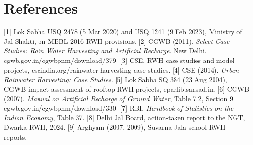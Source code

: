 \section*{References}
\scriptsize\setlength{\parskip}{0pt}
[1] Lok Sabha USQ 2478 (5 Mar 2020) and USQ 1241 (9 Feb 2023), Ministry of Jal Shakti, on MBBL 2016 RWH provisions.
[2] CGWB (2011). \emph{Select Case Studies: Rain Water Harvesting and Artificial Recharge}. New Delhi. cgwb.gov.in/cgwbpnm/download/379.
[3] CSE, RWH case studies and model projects, cseindia.org/rainwater-harvesting-case-studies. [4] CSE (2014). \emph{Urban Rainwater Harvesting: Case Studies}.
[5] Lok Sabha SQ 384 (23 Aug 2004), CGWB impact assessment of rooftop RWH projects, eparlib.sansad.in.
[6] CGWB (2007). \emph{Manual on Artificial Recharge of Ground Water}, Table 7.2, Section 9. cgwb.gov.in/cgwbpnm/download/330.
[7] RBI, \emph{Handbook of Statistics on the Indian Economy}, Table 37.
[8] Delhi Jal Board, action-taken report to the NGT, Dwarka RWH, 2024. [9] Arghyam (2007, 2009), Suvarna Jala school RWH reports.

